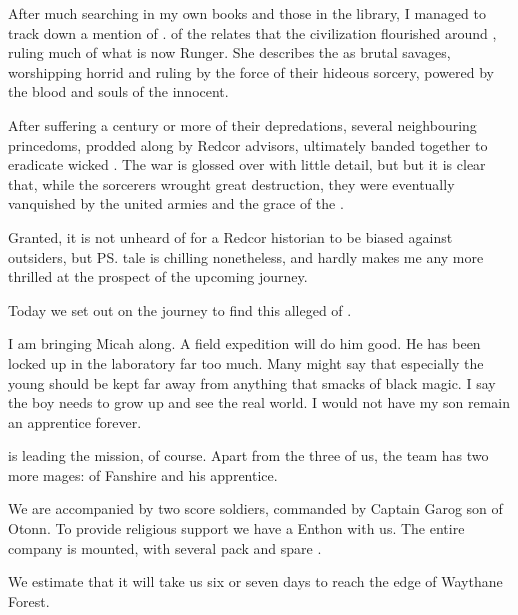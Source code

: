 \begin{diary}%
\diarystamp{\dateTantorResearchesEreshKal}

\new
After much searching in my own books and those in the library, I managed to track down a mention of \EreshKal.  \Sylvie{} \Dereine{} of the  relates that the \EreshKali{} civilization flourished around , ruling much of what is now Runger. She describes the \EreshKali{} as brutal savages, worshipping horrid  and ruling by the force of their hideous sorcery, powered by the blood and souls of the innocent. 

After suffering a century or more of their depredations, several neighbouring princedoms, prodded along by Redcor advisors, ultimately banded together to eradicate wicked \EreshKal. The war is glossed over with little detail, but but it is clear that, while the \EreshKali{} sorcerers wrought great destruction, they were eventually vanquished by the united armies and the grace of the . 

Granted, it is not unheard of for a Redcor historian to be biased against outsiders, but \ps{\Dereine} tale is chilling nonetheless, and hardly makes me any more thrilled at the prospect of the upcoming journey.
\end{diary}








\begin{diary}%
\diarystamp{\dateTakestshaSetsOut}

\new
%
%
Today we set out on the journey to find this alleged  of \EreshKal. 

I am bringing Micah along. 
A field expedition will do him good. 
He has been locked up in the laboratory far too much. 
Many might say that especially the young should be kept far away from anything that smacks of black magic. 
I say the boy needs to grow up and see the real world. 
I would not have my son remain an apprentice forever. 

\Miss{} \Takestsha{} is leading the mission, of course. 
Apart from the three of us, the team has two more mages: 
\Orla{} of Fanshire and his apprentice.

We are accompanied by two score soldiers, commanded by Captain Garog son of Otonn. 
To provide religious support we have a  Enthon with us. 
The entire company is mounted, with several pack \belwans{} and spare \relcs. 

We estimate that it will take us six or seven days to reach the edge of Waythane Forest. 
\end{diary}







